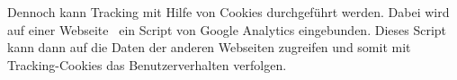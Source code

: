 Dennoch kann Tracking mit Hilfe von Cookies durchgeführt werden.
Dabei wird auf einer Webseite \zb\ ein Script von Google Analytics eingebunden. Dieses Script kann dann auf die Daten der anderen Webseiten zugreifen und somit mit Tracking-Cookies das Benutzer\-verhalten verfolgen.







\clearpage

\clearpage

